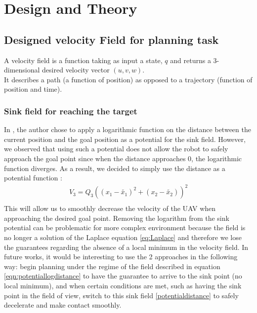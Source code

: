 \section{Design and Theory}
\subsection{Designed velocity Field for planning task}
A velocity field is a function taking as input a state, $q$ and returns a 3-dimensional desired velocity vector $(u,v,w)$.\\ It describes a path (a function of position) as opposed to a trajectory (function of position and time).
\subsubsection{Sink field for reaching the target}
In \cite{mcinnes2003velocity}, the author chose to apply a logarithmic function on the distance between the current position and the goal position as a potential for the sink field. 
However, we observed that using such a potential does not allow the robot to safely approach the goal point since when the distance approaches 0, the logarithmic function diverges.
As a result, we decided to simply use the distance as a potential function :
\begin{align} %
    {V}_{3} = {Q}_{3} (({x}_{1}-\tilde{{x}_{1}})^2+({x}_{2}-\tilde{{x}_{2}}))^2 \\ 
    \label{potentialdistance}
\end{align}
This will allow us to smoothly decrease the velocity of the UAV when approaching the desired goal point.
Removing the logarithm from the sink potential can be problematic for more complex environment because the field is no longer a solution of the Laplace equation \ref{eq:Laplace} and therefore we lose the guarantees regarding the absence of a local minimum in the velocity field.
In future works, it would be interesting to use the 2 approaches in the following way: begin planning under the regime of the field described in equation \ref{eqn:potentiallogdistance} to have the guarantee to arrive to the sink point (no local minimum), and when certain conditions are met, 
such as having the sink point in the field of view, switch to this sink field \ref{potentialdistance} to safely decelerate and make contact smoothly.
